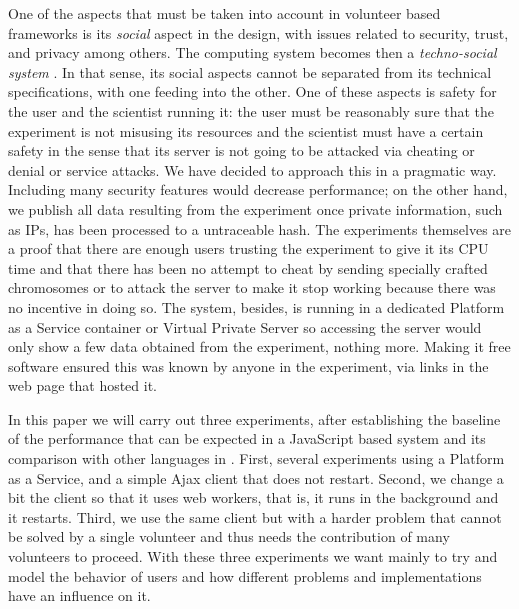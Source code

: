 \documentclass{sig-alternate}
\begin{document}

One of the aspects that must be taken into account in volunteer based
frameworks is its {\em social} aspect in the design, with 
issues related to security, trust, and privacy among others. 
The computing system becomes then a {\em techno-social system}
\cite{vespignani2009predicting}. In that sense, its social aspects
cannot be separated from its technical specifications, with one
feeding into the other. One of these aspects is safety for the user
and the scientist running it: the user must be reasonably sure that the
experiment is not misusing its resources and the scientist must have a
certain safety in the sense that its server is not going to be
attacked via cheating or denial or service attacks. We have decided to
approach this in a pragmatic way. Including many security features
would decrease performance; on the other hand, we publish all data
resulting from the experiment once private information, such as IPs,
has been processed to a untraceable hash. The experiments themselves
are a proof that there are enough users trusting the experiment to
give it its CPU time and that there has been no attempt to cheat by
sending specially crafted chromosomes or to attack the server to make
it stop working because there was no incentive in doing so. The
system, besides, is running in a dedicated Platform as a Service
container or Virtual Private Server so accessing the server would only
show a few data obtained from the experiment, nothing more. Making it
free software ensured this was known by anyone in the experiment, via
links in the web page that hosted it.

In this paper we will carry out three experiments, after establishing
the baseline of the performance that can be expected in a JavaScript
based system and its comparison with other languages in
\cite{2016arXiv160101607Manom}. First, several experiments using a
Platform as a Service, and a simple Ajax client that does not
restart. Second, we change a bit the client so that it uses web
workers, that is, it runs in the background and it restarts. Third, we use the same
client but with a harder problem that cannot be solved by a single
volunteer and thus needs the contribution of many volunteers to
proceed. With these three experiments we want mainly to try and model
the behavior of users and how different problems and implementations
have an influence on it. 
\end{document}
